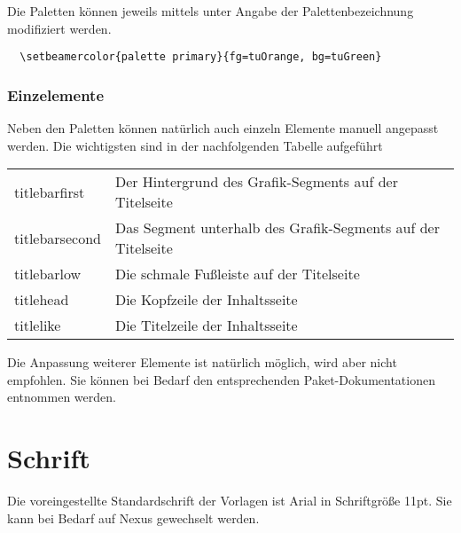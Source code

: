 Die Paletten können jeweils mittels 
unter Angabe der Palettenbezeichnung modifiziert werden.

\begin{example}
\begin{lstlisting}
  \setbeamercolor{palette primary}{fg=tuOrange, bg=tuGreen}
\end{lstlisting}
\end{example}

\subsubsection{Einzelemente}

Neben den Paletten können natürlich auch einzeln Elemente manuell angepasst
werden. Die wichtigsten sind in der nachfolgenden Tabelle aufgeführt

\begin{tabularx}{\textwidth}{lX}
  \ttfamily titlebarfirst &
    Der Hintergrund des Grafik-Segments auf der Titelseite\\
  \ttfamily titlebarsecond &
    Das Segment unterhalb des Grafik-Segments auf der Titelseite\\
  \ttfamily titlebarlow &
    Die schmale Fußleiste auf der Titelseite\\
  \ttfamily titlehead &
    Die Kopfzeile der Inhaltsseite\\
  \ttfamily titlelike &
    Die Titelzeile der Inhaltsseite\\
\end{tabularx}

Die Anpassung weiterer Elemente ist natürlich möglich,
wird aber nicht empfohlen.
Sie können bei Bedarf den entsprechenden Paket-Dokumentationen entnommen werden.


% 
% 

\section{Schrift}

Die voreingestellte Standardschrift der Vorlagen ist Arial in Schriftgröße 11pt.
Sie kann bei Bedarf auf Nexus gewechselt werden.

